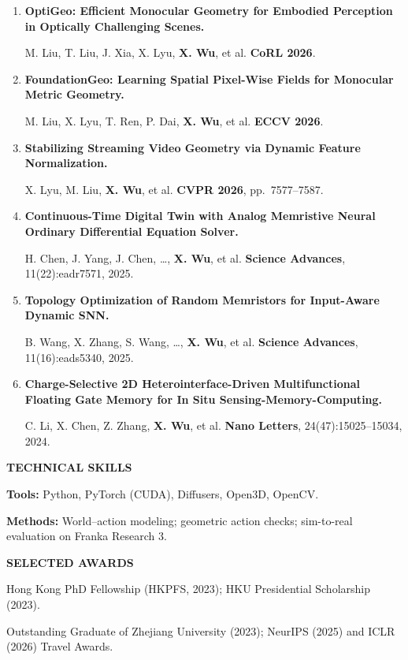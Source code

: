 \documentclass[a4paper]{article}
\newcommand{\cvsection}[1]{%
  \par\vspace{2.0pt}%
  {\color{cvblue}\fontsize{11}{12.2}\selectfont\bfseries\MakeUppercase{#1}}\par
  \vspace{-4pt}{\color{cvblue}\rule{\textwidth}{0.4pt}}\par\vspace{1.0pt}%
}
\begin{document}
{\begin{enumerate}[resume,leftmargin=1.6em,labelsep=0.38em,itemsep=0.4pt,topsep=1.3pt,parsep=0pt,partopsep=0pt]
\item \textbf{OptiGeo: Efficient Monocular Geometry for Embodied Perception in Optically Challenging Scenes.}\par
M. Liu, T. Liu, J. Xia, X. Lyu, \textbf{X. Wu}, et al. \hfill \textbf{CoRL 2026}.
\item \textbf{FoundationGeo: Learning Spatial Pixel-Wise Fields for Monocular Metric Geometry.}\par
M. Liu, X. Lyu, T. Ren, P. Dai, \textbf{X. Wu}, et al. \hfill \textbf{ECCV 2026}.
\item \textbf{Stabilizing Streaming Video Geometry via Dynamic Feature Normalization.}\par
X. Lyu, M. Liu, \textbf{X. Wu}, et al. \hfill \textbf{CVPR 2026}, pp.\ 7577--7587.
\item \textbf{Continuous-Time Digital Twin with Analog Memristive Neural Ordinary Differential Equation Solver.}\par
H. Chen, J. Yang, J. Chen, \ldots, \textbf{X. Wu}, et al. \hfill \textbf{Science Advances}, 11(22):eadr7571, 2025.
\item \textbf{Topology Optimization of Random Memristors for Input-Aware Dynamic SNN.}\par
B. Wang, X. Zhang, S. Wang, \ldots, \textbf{X. Wu}, et al. \hfill \textbf{Science Advances}, 11(16):eads5340, 2025.
\item \textbf{Charge-Selective 2D Heterointerface-Driven Multifunctional Floating Gate Memory for In Situ Sensing-Memory-Computing.}\par
C. Li, X. Chen, Z. Zhang, \textbf{X. Wu}, et al. \hfill \textbf{Nano Letters}, 24(47):15025--15034, 2024.
\end{enumerate}}

\cvsection{Technical Skills}
\textbf{Tools:} Python, PyTorch (CUDA), Diffusers, Open3D, OpenCV.\par
\textbf{Methods:} World--action modeling; geometric action checks; sim-to-real evaluation on Franka Research 3.


\cvsection{Selected Awards}
Hong Kong PhD Fellowship (HKPFS, 2023); HKU Presidential Scholarship (2023).\par
Outstanding Graduate of Zhejiang University (2023); NeurIPS (2025) and ICLR (2026) Travel Awards.
\end{document}

